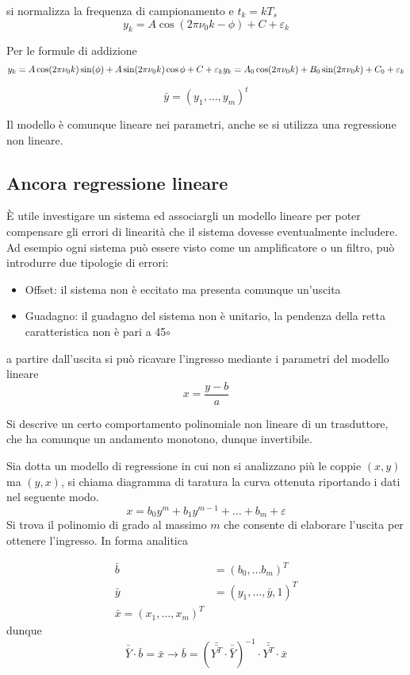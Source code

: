 si normalizza la frequenza di campionamento e $t_k = kT_s$
$$
y_k = A\cos (2\pi \nu_0 k - \phi) + C + \varepsilon_k
$$

Per le formule di addizione
$$
y_k = A\cos(2\pi\nu_0 k ) \sin(\phi) + A\sin(2\pi\nu_0 k) \cos\phi + C +
\varepsilon_k\\
y_k = A_0\cos(2\pi \nu_0 k) + B_0\sin(2\pi\nu_0 k ) + C_0 + \varepsilon_k
$$

$$
\bar{y} = (y_1,\dots,y_m)^t
$$


Il modello è comunque lineare nei parametri, anche se si utilizza una
regressione non lineare.






\subsection{Ancora regressione lineare}
È utile investigare un sistema ed associargli un modello lineare per poter
compensare gli errori di linearità che il sistema dovesse eventualmente
includere. Ad esempio ogni sistema può essere visto come un amplificatore o un
filtro, può introdurre due tipologie di errori:
\begin{itemize}
\item Offset: il sistema non è eccitato ma presenta comunque un'uscita
\item Guadagno: il guadagno del sistema non è unitario, la pendenza della retta
caratteristica non è pari a 45$\circ$
\end{itemize}

a partire dall'uscita si può ricavare l'ingresso mediante i parametri del
modello lineare
$$
x = \frac{y-b}{a}
$$

Si descrive un certo comportamento polinomiale non lineare di un trasduttore,
che ha comunque un andamento monotono, dunque invertibile.

Sia dotta un modello di regressione in cui non si analizzano più le coppie
$(x,y)$ ma $(y,x)$, si chiama diagramma di taratura la curva ottenuta
riportando i dati nel seguente modo.
$$
x = b_0y^m + b_1y^{m-1} + \dots + b_m + \varepsilon
$$
Si trova il polinomio di grado al massimo $m$ che consente di elaborare
l'uscita per ottenere l'ingresso.
In forma analitica

$$\begin{aligned}
\bar{b} &= (b_0,\dots b_m)^T \\
\bar{y} &= (y_1,\dots, \bar{y},1)^T\\
\bar{x} = (x_1,\dots, x_m)^T
\end{aligned}$$
dunque
$$
\bar{\bar{Y}}\cdot\bar{b} = \bar{x} \rightarrow \bar{b} =
(\bar{\bar{Y^T}}\cdot\bar{\bar{Y}})^{-1}\cdot\bar{\bar{Y^T}}\cdot \bar{x}
$$

